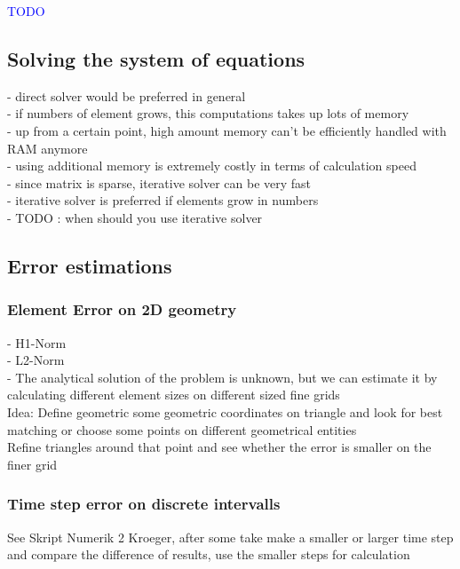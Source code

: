 \documentclass[parskip=half, titlepage=yes, 12pt, BCOR=12mm, DIV=calc]{scrartcl}
\begin{document}
\textcolor{blue}{TODO}

\subsection{Solving the system of equations}
- direct solver would be preferred in general \\
- if numbers of element grows, this computations takes up lots of memory \\
- up from a certain point, high amount memory can't be efficiently handled with RAM anymore \\
- using additional memory is extremely costly in terms of calculation speed \\
- since matrix is sparse, iterative solver can be very fast \\
- iterative solver is preferred if elements grow in numbers \\
- TODO : when should you use iterative solver \\

\subsection{Error estimations}

\subsubsection{Element Error on 2D geometry}
- H1-Norm \\
- L2-Norm \\

- The analytical solution of the problem is unknown, but we can estimate it by calculating different element sizes on different sized fine grids \\

Idea: Define geometric some geometric coordinates on triangle and look for best matching or choose some points on different geometrical entities \\

Refine triangles around that point and see whether the error is smaller on the finer grid \\

\subsubsection{Time step error on discrete intervalls}

See Skript Numerik 2 Kroeger, after some take make a smaller or larger time step and compare the difference of results, use the smaller steps for calculation \\
\end{document}
